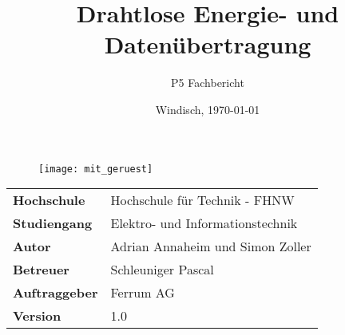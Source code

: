 \documentclass[final]{fhnwreport}       %
\title{Drahtlose Energie- und Datenübertragung}          %
\author{P5 Fachbericht}          		%
\date{Windisch, {\today}}             	%
\begin{document}
\maketitle

\vspace*{-1cm}						    %
\vfill
\begin{figure}[H]
\centering
\texttt{[image: mit\_geruest]}
\end{figure}
\vfill

{
\renewcommand\arraystretch{2}
\begin{center}
\begin{tabular}{>{\bf}p{4cm} l}
Hochschule                 &    Hochschule für Technik - FHNW\\
Studiengang                &    Elektro- und Informationstechnik\\
Autor   		           & 	Adrian Annaheim und Simon Zoller\\
Betreuer                   &    Schleuniger Pascal\\
Auftraggeber               &    Ferrum AG\\
Version                    &    1.0 %
\end{tabular}
\end{center}
}

\clearpage
			
%

\tableofcontents
\clearpage







{\sloppypar
\printbibliography[heading=bibintoc]
\label{sec:lit}
}



{%
}
\end{document}
